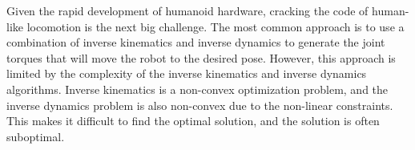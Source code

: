 Given the rapid development of humanoid hardware, cracking the code of human-like locomotion is the next big challenge. The most common approach is to use a combination of inverse kinematics and inverse dynamics to generate the joint torques that will move the robot to the desired pose. However, this approach is limited by the complexity of the inverse kinematics and inverse dynamics algorithms. Inverse kinematics is a non-convex optimization problem, and the inverse dynamics problem is also non-convex due to the non-linear constraints. This makes it difficult to find the optimal solution, and the solution is often suboptimal.
